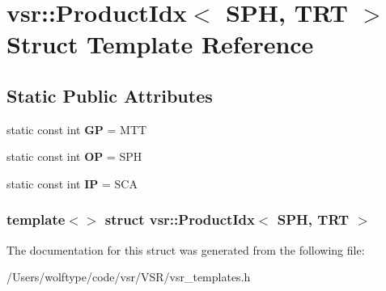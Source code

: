\hypertarget{structvsr_1_1_product_idx_3_01_s_p_h_00_01_t_r_t_01_4}{\section{vsr\-:\-:Product\-Idx$<$ S\-P\-H, T\-R\-T $>$ Struct Template Reference}
\label{structvsr_1_1_product_idx_3_01_s_p_h_00_01_t_r_t_01_4}
}
\subsection*{Static Public Attributes}
\begin{DoxyCompactItemize}
\item 
\hypertarget{structvsr_1_1_product_idx_3_01_s_p_h_00_01_t_r_t_01_4_a7505cf2ce78dcc38cac86654c7a89fbe}{static const int {\bfseries G\-P} = M\-T\-T}\label{structvsr_1_1_product_idx_3_01_s_p_h_00_01_t_r_t_01_4_a7505cf2ce78dcc38cac86654c7a89fbe}

\item 
\hypertarget{structvsr_1_1_product_idx_3_01_s_p_h_00_01_t_r_t_01_4_afc2d3ea16e3ab0c49615ac496bcce113}{static const int {\bfseries O\-P} = S\-P\-H}\label{structvsr_1_1_product_idx_3_01_s_p_h_00_01_t_r_t_01_4_afc2d3ea16e3ab0c49615ac496bcce113}

\item 
\hypertarget{structvsr_1_1_product_idx_3_01_s_p_h_00_01_t_r_t_01_4_a2e269c7deccd17b00046a56a86a5cbb7}{static const int {\bfseries I\-P} = S\-C\-A}\label{structvsr_1_1_product_idx_3_01_s_p_h_00_01_t_r_t_01_4_a2e269c7deccd17b00046a56a86a5cbb7}

\end{DoxyCompactItemize}
\subsubsection*{template$<$$>$ struct vsr\-::\-Product\-Idx$<$ S\-P\-H, T\-R\-T $>$}



The documentation for this struct was generated from the following file\-:\begin{DoxyCompactItemize}
\item 
/\-Users/wolftype/code/vsr/\-V\-S\-R/vsr\-\_\-templates.\-h\end{DoxyCompactItemize}
